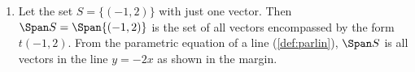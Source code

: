 \begin{example} \label{eg:span}
\begin{enumerate}
\item Let the set \(S=\{(-1,2)\}\) with just one vector.  
%
Then \(\Span S=\Span\{(-1,2)\}\) is the set of all vectors encompassed by the form \(t(-1,2)\).
From the parametric equation of a line (\autoref{def:parlin}), \(\Span S\) is all vectors in the line \(y=-2x\) as shown in the margin.


\end{enumerate}
\end{example}
